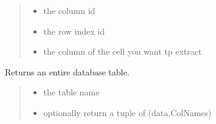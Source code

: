 \documentclass[letterpaper,12pt,english]{sphinxmanual}
\begin{document}
\begin{fulllineitems}
\begin{fulllineitems}
\begin{quote}
\begin{description}
\begin{itemize}
\item {} 
\sphinxAtStartPar
{} \textendash{} the column id

\item {} 
\sphinxAtStartPar
{} \textendash{} the row index id

\item {} 
\sphinxAtStartPar
{} \textendash{} the column of the cell you want tp extract

\end{itemize}

\end{description}\end{quote}

\end{fulllineitems}


\begin{fulllineitems}
\label{\detokenize{api/networking:cbmpy.CBNetDB.DBTools.getTable}}
\pysigstartsignatures
\pysiglinewithargsret
{}
{\sphinxparamcomma {}}
{}
\pysigstopsignatures
\sphinxAtStartPar
Returns an entire database table.
\begin{quote}\begin{description}
\begin{itemize}
\item {} 
\sphinxAtStartPar
{} \textendash{} the table name

\item {} 
\sphinxAtStartPar
{} \textendash{} optionally return a tuple of (data,ColNames)

\end{itemize}

\end{description}\end{quote}

\end{fulllineitems}



\end{fulllineitems}
\end{document}
